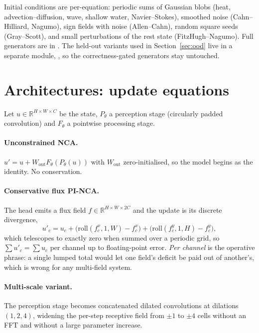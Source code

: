 Initial conditions are per-equation: periodic sums of Gaussian blobs (heat,
advection--diffusion, wave, shallow water, Navier--Stokes), smoothed noise (Cahn--Hilliard,
Nagumo), sign fields with noise (Allen--Cahn), random square seeds (Gray--Scott), and small
perturbations of the rest state (FitzHugh--Nagumo). Full generators are in
. The held-out variants used in Section~\ref{sec:ood} live in a
separate module, , so the correctness-gated generators stay
untouched.

\section{Architectures: update equations}\label{app:arch}

Let $u \in \mathbb{R}^{H\times W\times C}$ be the state, $P_\theta$ a perception stage
(circularly padded convolution) and $F_\theta$ a pointwise processing stage.

\paragraph{Unconstrained NCA.} $u' = u + W_{\text{out}} F_\theta(P_\theta(u))$ with
$W_{\text{out}}$ zero-initialised, so the model begins as the identity. No conservation.

\paragraph{Conservative flux PI-NCA.} The head emits a flux field
$f \in \mathbb{R}^{H\times W\times 2C}$ and the update is its discrete divergence,
\begin{equation}
u'_c = u_c + \big(\mathrm{roll}(f^x_c, 1, W) - f^x_c\big)
           + \big(\mathrm{roll}(f^y_c, 1, H) - f^y_c\big),
\end{equation}
which telescopes to exactly zero when summed over a periodic grid, so $\sum u'_c = \sum
u_c$ per channel up to floating-point error. \emph{Per channel} is the operative phrase: a
single lumped total would let one field's deficit be paid out of another's, which is wrong
for any multi-field system.

\paragraph{Multi-scale variant.} The perception stage becomes concatenated dilated
convolutions at dilations $(1,2,4)$, widening the per-step receptive field from $\pm1$ to
$\pm4$ cells without an FFT and without a large parameter increase.

